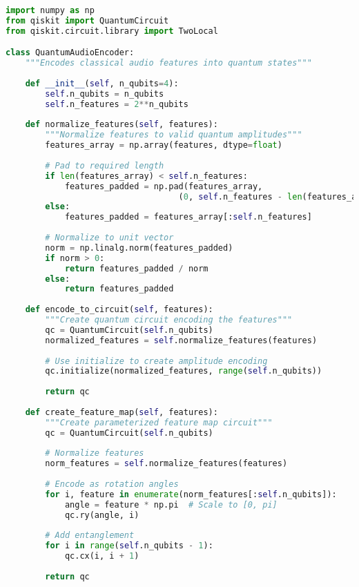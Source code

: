 \documentclass[11pt,a4paper]{article}
\begin{document}
\begin{lstlisting}[language=Python, caption=Complete QuantumAudioEncoder Implementation]
import numpy as np
from qiskit import QuantumCircuit
from qiskit.circuit.library import TwoLocal

class QuantumAudioEncoder:
    """Encodes classical audio features into quantum states"""
    
    def __init__(self, n_qubits=4):
        self.n_qubits = n_qubits
        self.n_features = 2**n_qubits
        
    def normalize_features(self, features):
        """Normalize features to valid quantum amplitudes"""
        features_array = np.array(features, dtype=float)
        
        # Pad to required length
        if len(features_array) < self.n_features:
            features_padded = np.pad(features_array, 
                                   (0, self.n_features - len(features_array)))
        else:
            features_padded = features_array[:self.n_features]
        
        # Normalize to unit vector
        norm = np.linalg.norm(features_padded)
        if norm > 0:
            return features_padded / norm
        else:
            return features_padded
    
    def encode_to_circuit(self, features):
        """Create quantum circuit encoding the features"""
        qc = QuantumCircuit(self.n_qubits)
        normalized_features = self.normalize_features(features)
        
        # Use initialize to create amplitude encoding
        qc.initialize(normalized_features, range(self.n_qubits))
        
        return qc
    
    def create_feature_map(self, features):
        """Create parameterized feature map circuit"""
        qc = QuantumCircuit(self.n_qubits)
        
        # Normalize features
        norm_features = self.normalize_features(features)
        
        # Encode as rotation angles
        for i, feature in enumerate(norm_features[:self.n_qubits]):
            angle = feature * np.pi  # Scale to [0, pi]
            qc.ry(angle, i)
        
        # Add entanglement
        for i in range(self.n_qubits - 1):
            qc.cx(i, i + 1)
        
        return qc
\end{lstlisting}
\end{document}
